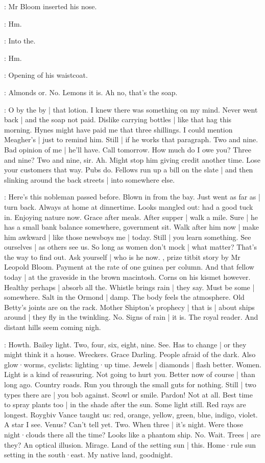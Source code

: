:
Mr Bloom inserted his nose.

\Bloom:
Hm.

:
Into the.

\Bloom:
Hm.

:
Opening of his waistcoat.

\Bloom:
Almonds or.
No.
Lemons
it is.
Ah no,
that's the soap.

\Bloom:
O by the by |
that lotion.
I knew there was something on my mind.
Never went back |
and the soap not paid.
Dislike carrying bottles |
like that hag this morning.
Hynes might have paid me that three shillings.
I could mention Meagher's |
just to remind him.
Still |
if he works that paragraph.
Two and nine.
Bad opinion of me |
he'll have.
Call tomorrow.
How much do I owe you?
Three and nine?
Two and nine,
sir.
Ah.
Might stop him giving credit another time.
Lose your customers that way.%
Pubs do.
Fellows run up a bill on the slate |
and then slinking around the back streets |
into somewhere else.

\Bloom:
Here's this nobleman passed before.
Blown in from the bay.
Just went as far as |
turn back.
Always at home at dinnertime.
Looks mangled out:
had a good tuck in.
Enjoying nature now.
Grace after meals.
After supper |
walk a mile.
Sure |
he has a small bank balance somewhere,
government sit.
Walk after him now |
make him awkward |
like those newsboys me |
today.
Still |
you learn something.
See ourselves |
as others see us.
So long as women don't mock |
what matter?
That's the way to find out.
Ask yourself |
who is he now.
,%
prize titbit story
by Mr Leopold Bloom.
Payment at the rate of one guinea per column.
And that fellow today |
at the graveside in the brown macintosh.
Corns on his kismet however.
Healthy perhaps |
absorb all the.
Whistle brings rain |
they say.
Must be some |
somewhere.
Salt in the Ormond |
damp.
The body feels the atmosphere.
Old Betty's joints are on the rack.
Mother Shipton's prophecy |
that is |
about ships around |
they fly in the twinkling.
No.
Signs of rain |
it is.
The royal reader.
And distant hills seem coming nigh.

\Bloom:
Howth.
Bailey light.
Two,
four,
six,
eight,
nine.
See.
Has to change |
or they might think it a house.
Wreckers.
Grace Darling.
People afraid of the dark.
Also glow·worms,
cyclists:
lighting·up time.%
Jewels |
diamonds |
flash better.
Women.
Light is a kind of reassuring.
Not going to hurt you.
Better now of course |
than long ago.
Country roads.
Run you through the small guts for nothing.
Still |
two types there are |
you bob against.
Scowl or smile.
Pardon!
Not at all.
Best time to spray plants too |
in the shade after the sun.
Some light still.
Red rays are longest.
Roygbiv
Vance taught us:
red,
orange,
yellow,
green,
blue,
indigo,
violet.
A star
I see.
Venus?
Can't tell yet.
Two.
When three |
it's night.
Were those night·clouds there all the time?
Looks like a phantom ship.
No.
Wait.
Trees |
are they?
An optical illusion.
Mirage.
Land of the setting sun |
this.
Home·rule sun setting in the south·east.
My native land,%
goodnight.

